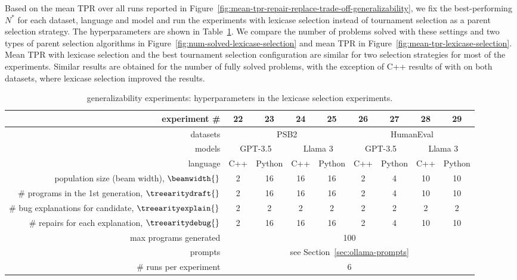 Based on the mean TPR over all runs reported in Figure~\ref{fig:mean-tpr-repair-replace-trade-off-generalizability}, we fix the best-performing $N^*$ for each dataset, language and model and run the experiments with lexicase selection instead of tournament selection as a parent selection strategy. 
The hyperparameters are shown in Table~\ref{tab:lexicase-selection-hyperparameters}.
We compare the number of problems solved with these settings and two types of parent selection algorithms in Figure~\ref{fig:num-solved-lexicase-selection} and mean TPR in Figure~\ref{fig:mean-tpr-lexicase-selection}.
Mean TPR with lexicase selection and the best tournament selection configuration are similar for two selection strategies for most of the experiments.
Similar results are obtained for the number of fully solved problems, with the exception of C++ results of \method{} with \gpt{} on both datasets, where lexicase selection improved the results.

\begin{table}[t]
\setlength{\tabcolsep}{4pt}
\centering
\caption{\method{} generalizability experiments: hyperparameters in the lexicase selection experiments.}\small
\label{tab:lexicase-selection-hyperparameters}
\begin{tabular}{rcccc|cccc}
\toprule
experiment \# & 22 & 23 & 24 & 25 & 26 & 27 & 28 & 29 \\
\midrule
datasets  & \multicolumn{4}{c|}{PSB2} & \multicolumn{4}{c}{HumanEval}  \\ 
\midrule
models  & 
\multicolumn{2}{c|}{GPT-3.5} &
\multicolumn{2}{c|}{Llama 3} &
\multicolumn{2}{c|}{GPT-3.5} &
\multicolumn{2}{c}{Llama 3}\\ 
\midrule
language  & C++ & Python & C++ & \multicolumn{1}{c|}{Python} & C++ & Python & C++ & Python \\
\midrule
population size (beam width), $\beamwidth{}$ & 2 & 16 & 16 & 16 & 2 & 4 & 10 & 10  \\
\# programs in the 1st generation, $\treearitydraft{}$ & 2 & 16 & 16 & 16 & 2 & 4 & 10 & 10  \\
\# bug explanations for candidate, $\treearityexplain{}$ & 2 & 2 & 2 & 2 & 2 & 2 & 2 & 2 \\
\# repairs for each explanation, $\treearitydebug{}$ & 2 & 16 & 16 & 16 & 2 & 4 & 10 & 10 \\
\midrule
max programs generated & \multicolumn{8}{c}{100} \\
prompts & \multicolumn{8}{c}{see Section~\ref{sec:ollama-prompts}} \\
\# runs per experiment &  \multicolumn{8}{c}{6} \\
\bottomrule
\end{tabular}
\end{table}



